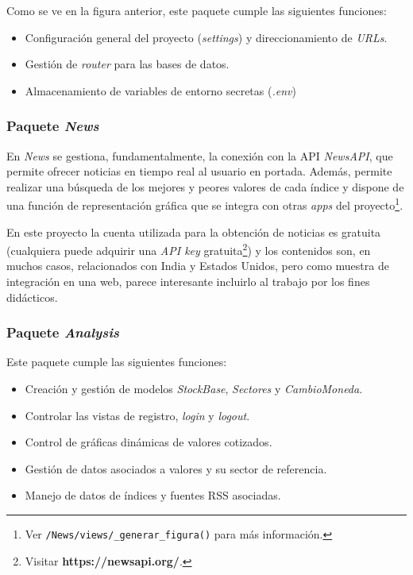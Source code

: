 
Como se ve en la figura anterior, este paquete cumple las siguientes funciones:

\begin{itemize}
\tightlist
\item
Configuración general del proyecto (\emph{settings}) y direccionamiento de \emph{URLs}.
\item
Gestión de \emph{router} para las bases de datos.
\item
Almacenamiento de variables de entorno secretas (\emph{.env})
\end{itemize}


\subsubsection{Paquete \emph{News}}


En \emph{News} se gestiona, fundamentalmente, la conexión con la API \emph{NewsAPI}, que permite ofrecer noticias en tiempo real al usuario en portada. Además, permite realizar una búsqueda de los mejores y peores valores de cada índice y dispone de una función de representación gráfica que se integra con otras \emph{apps} del proyecto\footnote{Ver \texttt{/News/views/\_generar\_figura()} para más información.}. 

En este proyecto la cuenta utilizada para la obtención de noticias es gratuita (cualquiera puede adquirir una \emph{API key} gratuita\footnote{Visitar \textbf{https://newsapi.org/}.}) y los contenidos son, en muchos casos, relacionados con India y Estados Unidos, pero como muestra de integración en una web, parece interesante incluirlo al trabajo por los fines didácticos. 


\subsubsection{Paquete \emph{Analysis}}


Este paquete cumple las siguientes funciones:

\begin{itemize}
\tightlist
\item
Creación y gestión de modelos \emph{StockBase}, \emph{Sectores} y \emph{CambioMoneda}.
\item
Controlar las vistas de registro, \emph{login} y \emph{logout}.
\item
Control de gráficas dinámicas de valores cotizados.
\item
Gestión de datos asociados a valores y su sector de referencia.
\item 
Manejo de datos de índices y fuentes RSS asociadas. 
\end{itemize}


